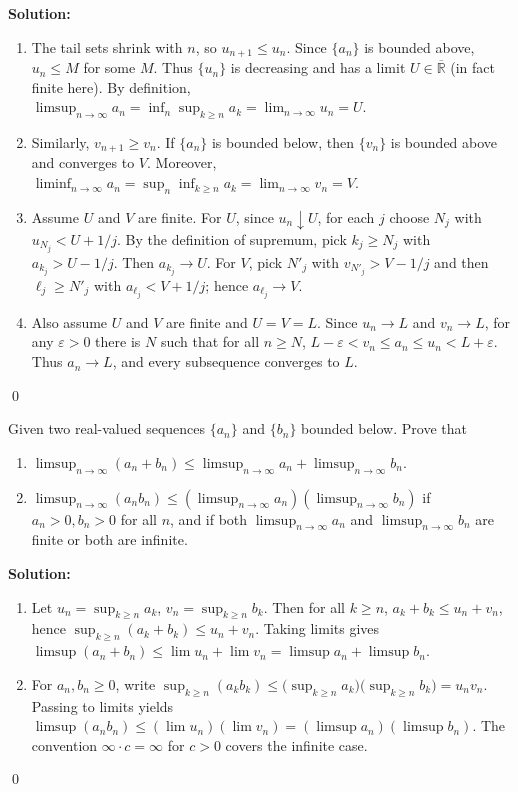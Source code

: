\noindent\textbf{Solution:}
\begin{enumerate}[label=(\alph*)]
\item The tail sets shrink with \(n\), so \(u_{n+1}\le u_n\). Since \(\{a_n\}\) is bounded above, \(u_n\le M\) for some \(M\). Thus \(\{u_n\}\) is decreasing and has a limit \(U\in\overline{\mathbb{R}}\) (in fact finite here). By definition, \(\limsup_{n\to\infty} a_n=\inf_n \sup_{k\ge n} a_k=\lim_{n\to\infty} u_n=U\).
\item Similarly, \(v_{n+1}\ge v_n\). If \(\{a_n\}\) is bounded below, then \(\{v_n\}\) is bounded above and converges to \(V\). Moreover, \(\liminf_{n\to\infty} a_n=\sup_n \inf_{k\ge n} a_k=\lim_{n\to\infty} v_n=V\).
\item Assume \(U\) and \(V\) are finite. For \(U\), since \(u_n\downarrow U\), for each \(j\) choose \(N_j\) with \(u_{N_j}<U+1/j\). By the definition of supremum, pick \(k_j\ge N_j\) with \(a_{k_j}>U-1/j\). Then \(a_{k_j}\to U\). For \(V\), pick \(N'_j\) with \(v_{N'_j}>V-1/j\) and then \(\ell_j\ge N'_j\) with \(a_{\ell_j}<V+1/j\); hence \(a_{\ell_j}\to V\).
\item Also assume \(U\) and \(V\) are finite and \(U=V=L\). Since \(u_n\to L\) and \(v_n\to L\), for any \(\varepsilon>0\) there is \(N\) such that for all \(n\ge N\), \(L-\varepsilon<v_n\le a_n\le u_n<L+\varepsilon\). Thus \(a_n\to L\), and every subsequence converges to \(L\).
\end{enumerate}\qed


\begin{problembox}
Given two real-valued sequences \(\{a_n\}\) and \(\{b_n\}\) bounded below. Prove that
\begin{enumerate}[label=\alph*)]
\item \(\limsup_{n \to \infty} (a_n + b_n) \leq \limsup_{n \to \infty} a_n + \limsup_{n \to \infty} b_n\).
\item \(\limsup_{n \to \infty} (a_n b_n) \leq (\limsup_{n \to \infty} a_n)(\limsup_{n \to \infty} b_n)\) if \(a_n > 0, b_n > 0\) for all \(n\), and if both \(\limsup_{n \to \infty} a_n\) and \(\limsup_{n \to \infty} b_n\) are finite or both are infinite.
\end{enumerate}
\end{problembox}

\noindent\textbf{Solution:}
\begin{enumerate}[label=(\alph*)]
\item Let \(u_n=\sup_{k\ge n} a_k\), \(v_n=\sup_{k\ge n} b_k\). Then for all \(k\ge n\), \(a_k+b_k\le u_n+v_n\), hence \(\sup_{k\ge n}(a_k+b_k)\le u_n+v_n\). Taking limits gives \(\limsup(a_n+b_n)\le \lim u_n+\lim v_n=\limsup a_n+\limsup b_n\).
\item For \(a_n,b_n\ge 0\), write \(\sup_{k\ge n}(a_k b_k)\le \big(\sup_{k\ge n} a_k\big)\big(\sup_{k\ge n} b_k\big)=u_n v_n\). Passing to limits yields \(\limsup(a_n b_n)\le (\lim u_n)(\lim v_n)=(\limsup a_n)(\limsup b_n)\). The convention \(\infty\cdot c=\infty\) for \(c>0\) covers the infinite case.
\end{enumerate}\qed


